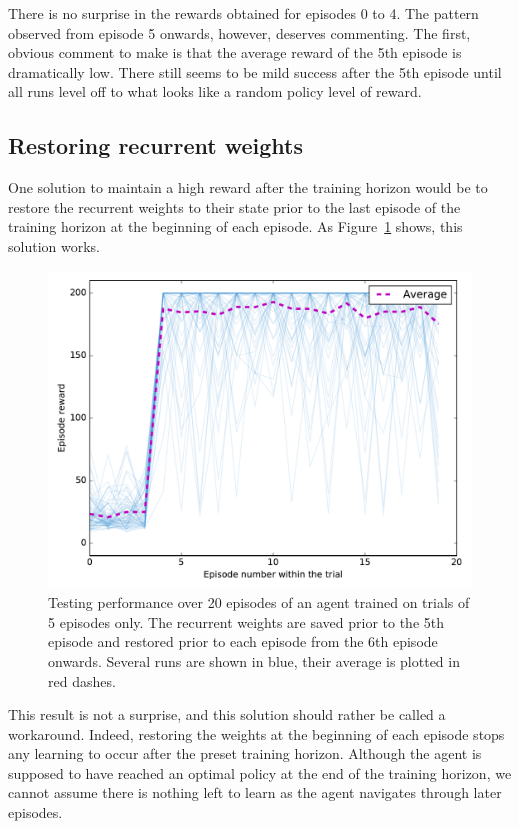 There is no surprise in the rewards obtained for episodes 0 to 4. The pattern
observed from episode 5 onwards, however, deserves commenting. The first, 
obvious comment to make is that the average reward of the 5th episode is
dramatically low.  There still seems to be mild success after the 5th episode 
until all runs level off to what looks like a random policy level of 
reward.

\subsection{Restoring recurrent weights}
One solution to maintain a high reward after the training horizon would be 
to restore the recurrent weights to their state prior to the last episode of 
the training horizon at the beginning of each episode. As 
Figure~\ref{fig:horizon_5_3perms_restoring} shows, this solution works.\\

\begin{figure}[H]
	\centering
	\includegraphics[width=0.70\linewidth]{fig/horizon_5_3perms_restoring.pdf}
	\caption{Testing performance over 20 episodes of an agent trained on 
	trials of 5 episodes only. The recurrent weights are saved prior to 
	the 5th episode and restored prior to each episode from the 6th episode
	onwards. Several runs are shown in blue, their average is plotted in
	red dashes.}
	\label{fig:horizon_5_3perms_restoring}
\end{figure}

This result is not a surprise, and this solution should rather be called a 
workaround. Indeed, restoring the weights at the beginning of each episode
stops any learning to occur after the preset training horizon. Although the
agent is supposed to have reached an optimal policy at the end of the training
horizon, we cannot assume there is nothing left to learn as the agent navigates
through later episodes.\\

